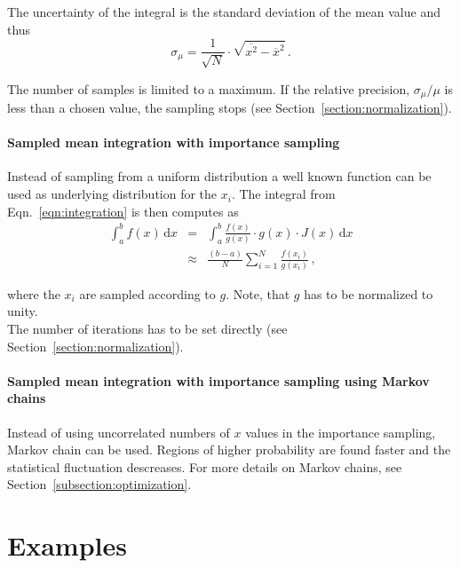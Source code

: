\documentclass[11pt, a4paper]{article}
\begin{document}
\noindent 
The uncertainty of the integral is the standard deviation of the mean
value and thus 
%
\begin{equation}
\sigma_{\mu} = \frac{1}{\sqrt{N}} \cdot \sqrt{\overline{x^{2}} - \overline{x}^{2}} \, . 
\end{equation} 

\noindent 
The number of samples is limited to a maximum. If the relative
precision, $\sigma_{\mu}/\mu$ is less than a chosen value, the
sampling stops (see Section~\ref{section:normalization}). 

\paragraph{Sampled mean integration with importance sampling} 

Instead of sampling from a uniform distribution a well known function
can be used as underlying distribution for the $x_{i}$. The integral
from Eqn.~\ref{eqn:integration} is then computes as 
%
\begin{eqnarray}
\int_{a}^{b} f(x) \, \mathrm{d}x & = & \int_{a}^{b} \frac{f(x)}{g(x)} \cdot g(x) \cdot J(x) \, \mathrm{d}x \\ 
 & \approx & \frac{(b - a)}{N} \sum_{i=1}^{N} \frac{f(x_{i})}{g(x_{i})} \, , 
\end{eqnarray} 

\noindent 
where the $x_{i}$ are sampled according to $g$. Note, that $g$ has to
be normalized to unity. \\ 

\noindent 
The number of iterations has to be set directly (see Section~\ref{section:normalization}). 

\paragraph{Sampled mean integration with importance sampling using Markov chains} 

Instead of using uncorrelated numbers of $x$ values in the importance
sampling, Markov chain can be used. Regions of higher probability are
found faster and the statistical fluctuation descreases. For more
details on Markov chains, see Section~\ref{subsection:optimization}.


\section{Examples}
\end{document}
